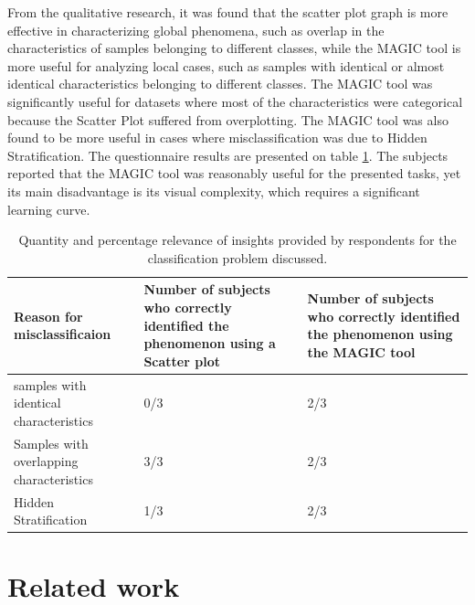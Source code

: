 \documentclass[11pt]{article}
\begin{document}
From the qualitative research, it was found that the scatter plot graph is more effective in characterizing global phenomena, such as overlap in the characteristics of samples belonging to different classes, while the MAGIC tool is more useful for analyzing local cases, such as samples with identical or almost identical characteristics belonging to different classes. The MAGIC tool was significantly useful for datasets where most of the characteristics were categorical because the Scatter Plot suffered from overplotting. The MAGIC tool was also found to be more useful in cases where misclassification was due to Hidden Stratification. The questionnaire results are presented on table \ref{table:tab2}. The subjects reported that the MAGIC tool was reasonably useful for the presented tasks, yet its main disadvantage is its visual complexity, which requires a significant learning curve.


\begin{table}[h]
\centering
\begin{tabular}{ |m{5cm}||m{5cm}|m{5.5cm}| } 
\hline
Reason for misclassificaion & Number of subjects who correctly identified the phenomenon using a Scatter plot & Number of subjects who correctly identified the phenomenon using the MAGIC tool \\
\hline
\hline
samples with identical characteristics & 0/3 & 2/3 \\
\hline
Samples with overlapping characteristics & 3/3 & 2/3 \\
\hline
Hidden Stratification & 1/3 & 2/3 \\
\hline
\end{tabular}
\caption{Quantity and percentage relevance of insights provided by respondents for the classification problem discussed.}
\label{table:tab2}
\end{table}

\section{Related work}\label{Related work}
\end{document}
